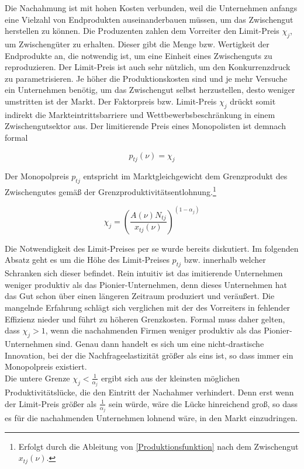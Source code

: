 Die Nachahmung ist mit hohen Kosten verbunden, weil die Unternehmen anfangs eine Vielzahl von Endprodukten auseinanderbauen müssen, um das Zwischengut herstellen zu können. Die Produzenten zahlen dem Vorreiter den Limit-Preis $\chi_j$, um Zwischengüter zu erhalten. Dieser gibt die Menge bzw. Wertigkeit der Endprodukte an, die notwendig ist, um eine Einheit eines Zwischenguts zu reproduzieren. Der Limit-Preis ist auch sehr nützlich, um den Konkurrenzdruck zu parametrisieren. Je höher die Produktionskosten sind und je mehr Versuche ein Unternehmen benötig, um das Zwischengut selbst herzustellen, desto weniger umstritten ist der Markt. Der Faktorpreis bzw. Limit-Preis $\chi_j$ drückt somit indirekt die Markteintrittsbarriere und Wettbewerbsbeschränkung in einem Zwischengutsektor aus. Der limitierende Preis eines Monopolisten ist demnach formal 


	\begin{equation}
		p_{tj}(\nu)=\chi_j \label{Grenzproduktentlohnung}
	\end{equation}


Der Monopolpreis $p_{tj}$ entspricht im Marktgleichgewicht dem Grenzprodukt des Zwischengutes gemä{\ss} der Grenzproduktivitätsentlohnung.\footnote{Erfolgt durch die Ableitung von \eqref{Produktionsfunktion} nach dem Zwischengut $x_{tj}(\nu)$.}

	\begin{equation}
		\chi_j=\left(\frac{A(\nu)N_{tj}}{x_{tj}(\nu)}\right)^{(1-\alpha_j)}
	\end{equation}


Die Notwendigkeit des Limit-Preises per se wurde bereits diskutiert. Im folgenden Absatz geht es um die Höhe des Limit-Preises $p_{tj}$  bzw. innerhalb welcher Schranken sich dieser befindet. Rein intuitiv ist das imitierende Unternehmen weniger produktiv als das Pionier-Unternehmen, denn dieses Unternehmen  hat das Gut schon über einen längeren Zeitraum produziert und veräu{\ss}ert. Die mangelnde Erfahrung schlägt sich verglichen mit der des Vorreiters in fehlender Effizienz nieder und führt zu höheren Grenzkosten. Formal muss daher gelten, dass $\chi_j>1$, wenn die nachahmenden Firmen weniger produktiv  als das Pionier-Unternehmen sind. Genau dann handelt es sich um eine nicht-drastische Innovation, bei der die Nachfrageelastizität grö{\ss}er als eins ist, so dass immer ein Monopolpreis existiert.\\


Die untere Grenze $\chi_j<\frac{1}{\alpha_j}$ ergibt sich aus der kleinsten möglichen Produktivitätslücke, die den Eintritt der Nachahmer verhindert. Denn erst wenn der Limit-Preis grö{\ss}er als $\frac{1}{\alpha_j}$ sein würde, wäre die Lücke hinreichend gro{\ss}, so dass es für die nachahmenden Unternehmen lohnend wäre, in den Markt einzudringen.\\


